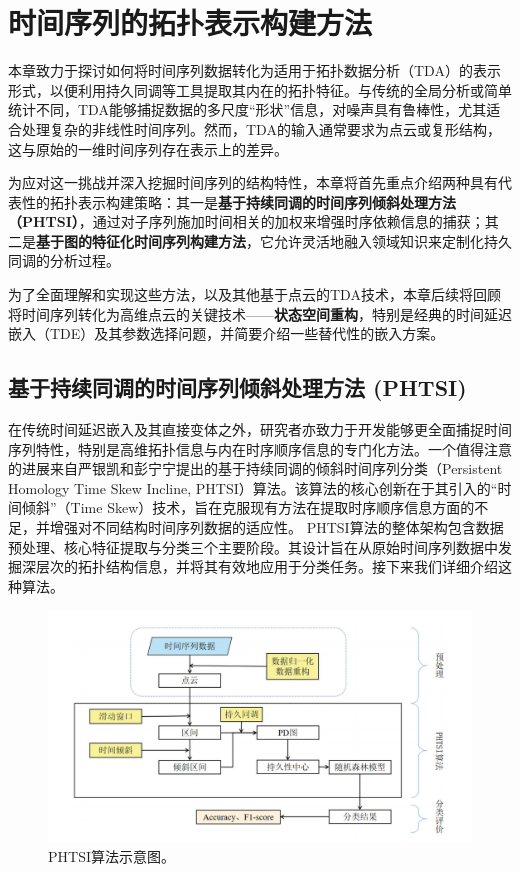 \section{时间序列的拓扑表示构建方法}

本章致力于探讨如何将时间序列数据转化为适用于拓扑数据分析（TDA）的表示形式，以便利用持久同调等工具提取其内在的拓扑特征。与传统的全局分析或简单统计不同，TDA能够捕捉数据的多尺度“形状”信息，对噪声具有鲁棒性，尤其适合处理复杂的非线性时间序列。然而，TDA的输入通常要求为点云或复形结构，这与原始的一维时间序列存在表示上的差异。

为应对这一挑战并深入挖掘时间序列的结构特性，本章将首先重点介绍两种具有代表性的拓扑表示构建策略：其一是\textbf{基于持续同调的时间序列倾斜处理方法（PHTSI）}，通过对子序列施加时间相关的加权来增强时序依赖信息的捕获；其二是\textbf{基于图的特征化时间序列构建方法}，它允许灵活地融入领域知识来定制化持久同调的分析过程。

为了全面理解和实现这些方法，以及其他基于点云的TDA技术，本章后续将回顾将时间序列转化为高维点云的关键技术——\textbf{状态空间重构}，特别是经典的时间延迟嵌入（TDE）及其参数选择问题，并简要介绍一些替代性的嵌入方案。
%
\subsection{基于持续同调的时间序列倾斜处理方法 (PHTSI)} %
在传统时间延迟嵌入及其直接变体之外，研究者亦致力于开发能够更全面捕捉时间序列特性，特别是高维拓扑信息与内在时序顺序信息的专门化方法。一个值得注意的进展来自严银凯和彭宁宁\cite{JSJC202406009}提出的基于持续同调的倾斜时间序列分类（Persistent Homology Time Skew Incline, PHTSI）算法。该算法的核心创新在于其引入的“时间倾斜”（Time Skew）技术，旨在克服现有方法在提取时序顺序信息方面的不足，并增强对不同结构时间序列数据的适应性。
PHTSI算法的整体架构包含数据预处理、核心特征提取与分类三个主要阶段。其设计旨在从原始时间序列数据中发掘深层次的拓扑结构信息，并将其有效地应用于分类任务。接下来我们详细介绍这种算法。

\begin{figure}[thbp!]
    \centering
    \includegraphics[width=1.0\textwidth]{figure/严银凯示意图.png}
    \caption{PHTSI算法示意图。}
    \label{fig:phtsi_algorithm}
\end{figure}

